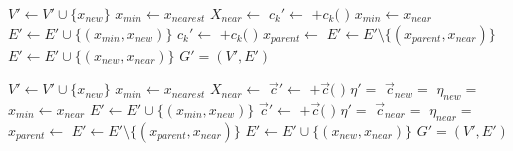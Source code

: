 \documentclass[paper=a4, fontsize=11pt]{scrartcl}
\begin{document}
\begin{algorithm}
\begin{algorithmic}[1]
\State $ V' \leftarrow V' \cup \{ x_{new} \} $
\State $ x_{min} \leftarrow x_{nearest} $
\State $ X_{near} \leftarrow $ 
		\State $ c_{k}' \leftarrow $  $ + c_{k}( $  $ ) $ 
		\State $ x_{min} \leftarrow x_{near} $
		\EndIf
	\EndIf
\EndFor
\State $ E' \leftarrow E' \cup \{ ( x_{min}, x_{new} ) \} $
	    \State $ c_{k}' \leftarrow $  $ + c_{k}( $  $ ) $ 
			\State $ x_{parent} \leftarrow $ 
			\State $ E' \leftarrow E' \setminus \{ ( x_{parent}, x_{near} ) \} $
			\State $ E' \leftarrow E' \cup \{ ( x_{new}, x_{near} ) \} $
		\EndIf
	\EndIf
\EndFor
\Return $ G' = (V', E') $ 
\end{algorithmic}
\label{alg:morrtstar:extend:ref}
\caption{ $ \mbox{Extend}_{Ref} (G, x) $}
\end{algorithm} 

\begin{algorithm}
\begin{algorithmic}[1]
\State $ V' \leftarrow V' \cup \{ x_{new} \} $
\State $ x_{min} \leftarrow x_{nearest} $
\State $ X_{near} \leftarrow $ 
		\State $ \vec{c}' \leftarrow $  $ + \vec{c}( $  $ ) $ 
		\State $ \eta' =  $ 
		\State $ \vec{c}_{new} = $  
		\State $ \eta_{new} = $ 
			\State $ x_{min} \leftarrow x_{near} $
		\EndIf
	\EndIf
\EndFor
\State $ E' \leftarrow E' \cup \{ ( x_{min}, x_{new} ) \} $
		\State $ \vec{c}' \leftarrow $  $ + \vec{c}( $  $ ) $ 
		\State $ \eta' =  $ 
		\State $ \vec{c}_{near} = $  
		\State $ \eta_{near} = $ 
			\State $ x_{parent} \leftarrow $ 
			\State $ E' \leftarrow E' \setminus \{ ( x_{parent}, x_{near} ) \} $
			\State $ E' \leftarrow E' \cup \{ ( x_{new}, x_{near} ) \} $
		\EndIf
	\EndIf
\EndFor
\Return $ G' = (V', E') $ 
\end{algorithmic}
\label{alg:morrtstar:extend:sub}
\caption{ $ \mbox{Extend}_{Sub} (G, x) $}
\end{algorithm} 
\end{document}
